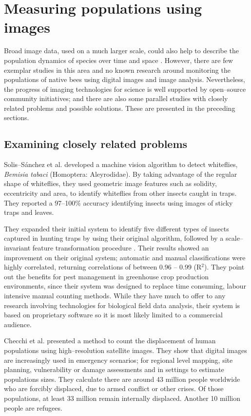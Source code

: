 \section{Measuring populations using images}
Broad image data, used on a much larger scale, could also help to describe the population dynamics of species over time and space \cite{Kelling2009}. However, there are few exemplar studies in this area and no known research around monitoring the populations of native bees using digital images and image analysis. Nevertheless, the progress of imaging technologies for science is well supported by open--source community initiatives; and there are also some parallel studies with closely related problems and possible solutions. These are presented in the preceding sections.

\subsection{Examining closely related problems}\label{sec:examining-closely-related-problems}
Solis--S{\'a}nchez et al. \cite{Solis2009} developed a machine vision algorithm to detect whiteflies, \emph{Bemisia tabaci} (Homoptera: Aleyrodidae).  By taking advantage of the regular shape of whiteflies, they used geometric image features such as solidity, eccentricity and area, to identify whiteflies from other insects caught in traps. They reported a 97--100\% accuracy identifying insects using images of sticky traps and leaves.

They expanded their initial system to identify five different types of insects captured in hunting traps by using their original algorithm, followed by a scale--invariant feature transformation procedure \cite{Solis2011}. Their results showed an improvement on their original system; automatic and manual classifications were highly correlated, returning correlations of between  0.96 -- 0.99 (R$^2$). They point out the benefits for pest management in greenhouse crop production environments, since their system was designed to replace time consuming, labour intensive manual counting methods. While they have much to offer to any research involving technologies for biological field data analysis, their system is based on proprietary software so it is most likely limited to a commercial audience.

Checchi et al. \cite{Checchi2013} presented a method to count the displacement of human populations using high--resolution satellite images.  They show that digital images are increasingly used in emergency scenarios; for regional level mapping, site planning, vulnerability or damage assessments and in settings to estimate populations sizes. They calculate there are around 43 million people worldwide who are forcibly displaced, due to armed conflict or other crises. Of those populations, at least 33 million remain internally displaced. Another 10 million people are refugees. 

